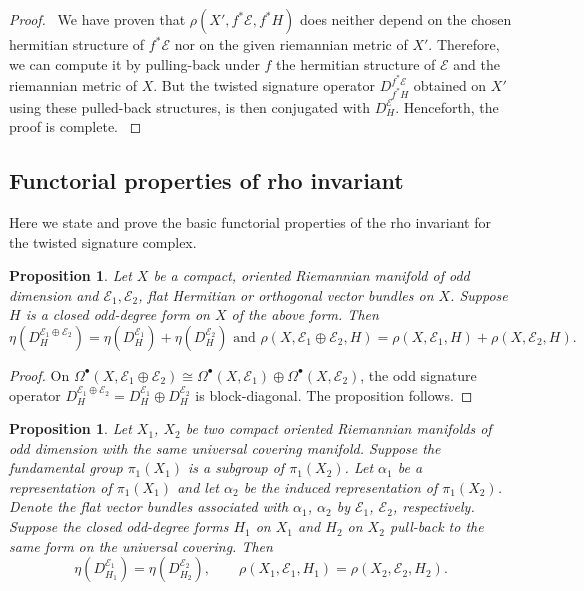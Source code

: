 \documentclass[12pt]{amsart}
\theoremstyle{plain}
\newtheorem{proposition}[theorem]{Proposition}
\theoremstyle{definition}
\theoremstyle{remark}
\begin{document}
{\begin{proof}\
{{We have proven that $\rho (X', f^*{\mathcal E}, f^*H)$ does neither depend on the chosen hermitian structure of $f^*{\mathcal E}$ nor on the given riemannian metric of $X'$. Therefore, we can compute it by  pulling-back under $f$ the hermitian structure of ${\mathcal E}$ and the riemannian metric of $X$. But the twisted signature operator $D^{f^*{\mathcal E}}_{f^*H}$ obtained on $X'$ using these pulled-back structures, is then conjugated with $D^{\mathcal E}_H$. Henceforth, the proof is complete.
}}
\end{proof}

\subsection{Functorial properties of rho invariant}\label{sect:func}

Here we state and prove the basic functorial properties of the rho invariant
 for the twisted signature complex.

\begin{proposition}
Let $X$ be a compact, oriented Riemannian manifold of odd dimension and ${\mathcal E}_1,{\mathcal E}_2$,
flat Hermitian or orthogonal vector bundles on $X$.
Suppose $H$ is a closed odd-degree form on $X$ {{of the above form}}.
Then 
$$
\eta(D^{{\mathcal E}_1\oplus{\mathcal E}_2}_H) = \eta(D^{{\mathcal E}_1}_H) + \eta(D^{{\mathcal E}_2}_H)\text{ and }\rho(X,{\mathcal E}_1\oplus{\mathcal E}_2,H)=\rho(X,{\mathcal E}_1,H)+ \rho(X,{\mathcal E}_2,H).
$$
\end{proposition}

\begin{proof}
On $\Omega^\bullet(X,{\mathcal E}_1\oplus{\mathcal E}_2)\cong\Omega^\bullet(X,{\mathcal E}_1)\oplus
\Omega^\bullet(X,{\mathcal E}_2)$, the odd signature
 operator $D^{{\mathcal E}_1\oplus{\mathcal E}_2}_H=
D^{{\mathcal E}_1}_H\oplus D^{{\mathcal E}_2}_H$ is block-diagonal.
The proposition follows.
\end{proof}

\begin{proposition}
Let $X_1$, $X_2$ be two compact oriented Riemannian manifolds of odd dimension with the same universal
covering manifold.
Suppose the fundamental group $\pi_1(X_1)$ is a subgroup of $\pi_1(X_2)$.
Let $\alpha_1$ be a representation of $\pi_1(X_1)$ and let $\alpha_2$ be the
induced representation of $\pi_1(X_2)$.
Denote the flat vector bundles associated with $\alpha_1$, $\alpha_2$ by
${\mathcal E}_1$, ${\mathcal E}_2$, respectively.
Suppose the closed odd-degree forms $H_1$ on $X_1$ and $H_2$ on $X_2$
pull-back to the same form on the universal covering.
Then 
$$
\eta(D^{{\mathcal E}_1}_{H_1}) = \eta(D^{{\mathcal E}_2}_{H_2}), \qquad \rho(X_1,{\mathcal E}_1,H_1)=\rho(X_2,{\mathcal E}_2,H_2).
$$
\end{proposition}

}
\end{document}
